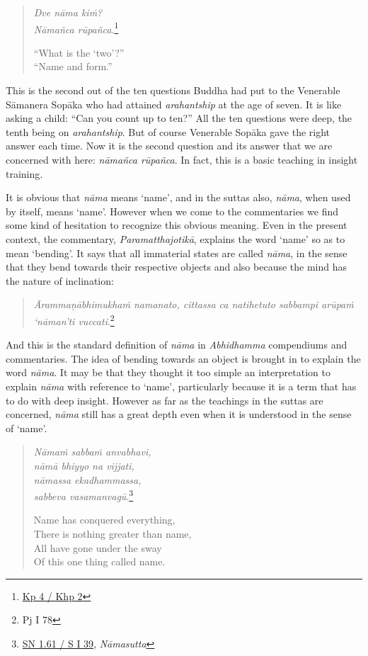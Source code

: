 \begin{quote}
\emph{Dve nāma kiṁ?}\\
\emph{Nāmañca rūpañca}.\footnote{\href{https://suttacentral.net/kp4/pli/ms}{Kp 4 / Khp 2}}

``What is the `two'?''\\
``Name and form.''
\end{quote}

This is the second out of the ten questions Buddha had put to the Venerable Sāmanera Sopāka who had attained \emph{arahantship} at the age of seven. It is like asking a child: ``Can you count up to ten?'' All the ten questions were deep, the tenth being on \emph{arahantship}. But of course Venerable Sopāka gave the right answer each time. Now it is the second question and its answer that we are concerned with here: \emph{nāmañca rūpañca}. In fact, this is a basic teaching in insight training.

It is obvious that \emph{nāma} means `name', and in the suttas also, \emph{nāma}, when used by itself, means `name'. However when we come to the commentaries we find some kind of hesitation to recognize this obvious meaning. Even in the present context, the commentary, \emph{Paramatthajotikā}, explains the word `name' so as to mean `bending'. It says that all immaterial states are called \emph{nāma}, in the sense that they bend towards their respective objects and also because the mind has the nature of inclination:

\begin{quote}
\emph{Ārammaṇābhimukhaṁ namanato, cittassa ca natihetuto sabbampi arūpaṁ `nāman'ti vuccati}.\footnote{Pj I 78}
\end{quote}

And this is the standard definition of \emph{nāma} in \emph{Abhidhamma} compendiums and commentaries. The idea of bending towards an object is brought in to explain the word \emph{nāma}. It may be that they thought it too simple an interpretation to explain \emph{nāma} with reference to `name', particularly because it is a term that has to do with deep insight. However as far as the teachings in the suttas are concerned, \emph{nāma} still has a great depth even when it is understood in the sense of `name'.

\begin{quote}
\emph{Nāmaṁ sabbaṁ anvabhavi,}\\
\emph{nāmā bhiyyo na vijjati,}\\
\emph{nāmassa ekadhammassa,}\\
\emph{sabbeva vasamanvagū}.\footnote{\href{https://suttacentral.net/sn1.61/pli/ms}{SN 1.61 / S I 39}, \emph{Nāmasutta}}

Name has conquered everything,\\
There is nothing greater than name,\\
All have gone under the sway\\
Of this one thing called name.
\end{quote}

